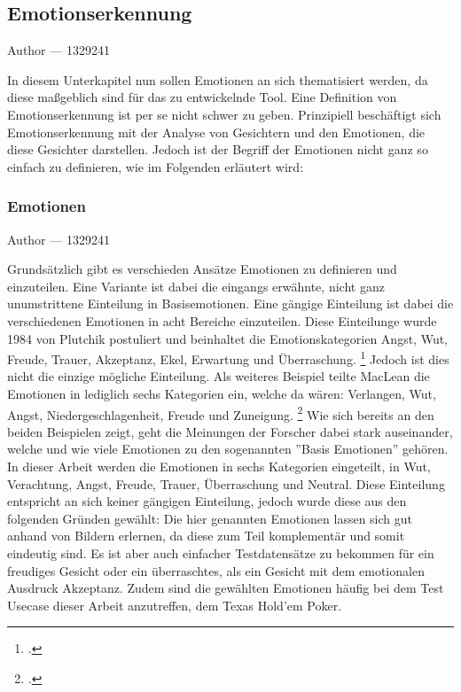 \documentclass[12pt, a4paper]{report}
\makeatletter
\newcommand{\sectionauthor}[1]{%
  {\parindent0pt\vspace*{-5pt}%
  \large{Author --- }
  \linespread{1.1}\large\scshape#1%
  \par\nobreak\vspace*{35pt} }
  \@afterheading%
}
\makeatother
\begin{document}
\subsection{Emotionserkennung}
\sectionauthor{1329241}
In diesem Unterkapitel nun sollen Emotionen an sich thematisiert werden, da diese maßgeblich sind für das zu entwickelnde Tool. Eine Definition von Emotionserkennung ist per se nicht schwer zu geben. Prinzipiell beschäftigt sich Emotionserkennung mit der Analyse von Gesichtern und den Emotionen, die diese Gesichter darstellen. Jedoch ist der Begriff der Emotionen nicht ganz so einfach zu definieren, wie im Folgenden erläutert wird: 


\subsubsection{Emotionen}
\sectionauthor{1329241}
Grundsätzlich gibt es verschieden Ansätze Emotionen zu definieren und einzuteilen. Eine Variante ist dabei die eingangs erwähnte, nicht ganz unumstrittene Einteilung in Basisemotionen. Eine gängige Einteilung ist dabei die verschiedenen Emotionen in acht Bereiche einzuteilen. Diese Einteilunge wurde 1984 von Plutchik postuliert und beinhaltet die Emotionskategorien Angst, Wut, Freude, Trauer, Akzeptanz, Ekel, Erwartung und Überraschung.
\footcite[Vgl. ][3]{FaceRec}
Jedoch ist dies nicht die einzige mögliche Einteilung. Als weiteres Beispiel teilte MacLean die Emotionen in lediglich sechs Kategorien ein, welche da wären: Verlangen, Wut, Angst, Niedergeschlagenheit, Freude und Zuneigung.
\footcite[Vgl. ][3]{FaceRec}
Wie sich bereits an den beiden Beispielen zeigt, geht die Meinungen der Forscher dabei stark auseinander, welche und wie viele Emotionen zu den sogenannten ''Basis Emotionen'' gehören. In dieser Arbeit werden die Emotionen in sechs Kategorien eingeteilt, in Wut, Verachtung, Angst, Freude, Trauer, Überraschung und Neutral. Diese Einteilung entspricht an sich keiner gängigen Einteilung, jedoch wurde diese aus den folgenden Gründen gewählt: \newline
Die hier genannten Emotionen lassen sich gut anhand von Bildern erlernen, da diese zum Teil komplementär und somit eindeutig sind. Es ist aber auch einfacher Testdatensätze zu bekommen für ein
freudiges Gesicht oder ein überraschtes, als ein Gesicht mit dem emotionalen Ausdruck Akzeptanz. Zudem sind die gewählten Emotionen häufig bei dem Test Usecase dieser Arbeit anzutreffen, dem Texas Hold'em Poker.
\end{document}
